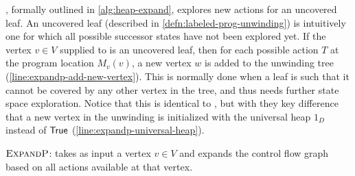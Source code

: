 \expandp, formally outlined in \autoref{alg:heap-expand}, explores new actions for an uncovered leaf. An uncovered leaf (described in \autoref{defn:labeled-prog-unwinding}) is intuitively one for which all possible successor states have not been explored yet. If the vertex $v \in V$ supplied to \expandp is an uncovered leaf, then for each possible action $T$ at the program location $M_v(v)$, a new vertex $w$ is added to the unwinding tree (\autoref{line:expandp-add-new-vertex}). This is normally done when a leaf is such that it cannot be covered by any other vertex in the tree, and thus needs further state space exploration. Notice that this is identical to \impact, but with they key difference that a new vertex in the unwinding is initialized with the universal heap $1_D$ instead of $\mathsf{True}$ (\autoref{line:expandp-universal-heap}).

\begin{algorithm}[ht]


  \caption{$\textsc{ExpandP}$: takes as input a vertex $v \in V$ and expands the control flow graph based on all actions available at that vertex.}
  \label{alg:heap-expand}
\end{algorithm}

